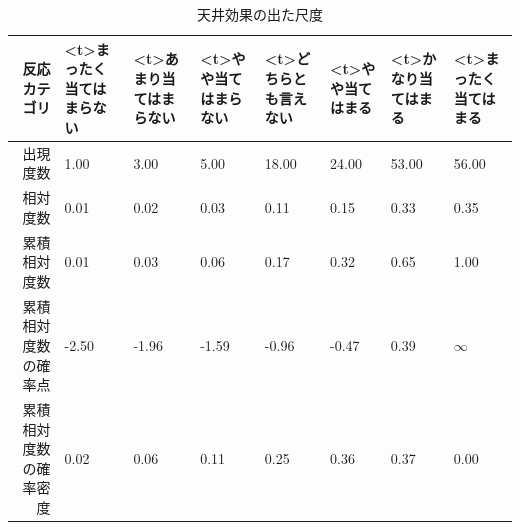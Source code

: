 \documentclass{ltjsbook}
\begin{document}
\begin{table}[ht]
	\centering
	\caption{天井効果の出た尺度}
	\begin{tabular}{rp{1cm}p{1cm}p{1cm}p{1cm}p{1cm}p{1cm}p{1cm}}
		\hline
		反応カテゴリ      & \pbox<t>{\small{まったく当てはまらない}} & \pbox<t>{\small{あまり当てはまらない}} & \pbox<t>{\small{やや当てはまらない}} & \pbox<t>{\small{どちらとも言えない}} & \pbox<t>{\small{やや当てはまる}} & \pbox<t>{\small{かなり当てはまる}} & \pbox<t>{\small{まったく当てはまる}} \\
		\hline
		出現度数        & 1.00                          & 3.00                         & 5.00                        & 18.00                       & 24.00                     & 53.00                      & 56.00                       \\
		相対度数        & 0.01                          & 0.02                         & 0.03                        & 0.11                        & 0.15                      & 0.33                       & 0.35                        \\
		累積相対度数      & 0.01                          & 0.03                         & 0.06                        & 0.17                        & 0.32                      & 0.65                       & 1.00                        \\
		累積相対度数の確率点  & -2.50                         & -1.96                        & -1.59                       & -0.96                       & -0.47                     & 0.39                       & $\infty$                    \\
		累積相対度数の確率密度 & 0.02                          & 0.06                         & 0.11                        & 0.25                        & 0.36                      & 0.37                       & 0.00                        \\
		\hline
	\end{tabular}
	\label{example2_1}
\end{table}
\end{document}
